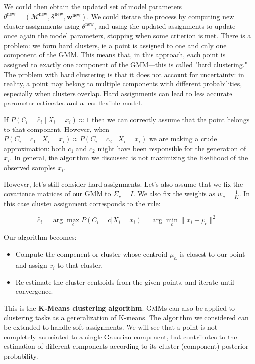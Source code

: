 We could then obtain the updated set of model parameters $\theta^{\text{new}} = (\mathcal{M}^{\text{new}}, \mathcal{S}^{\text{new}}, \mathbf{w}^{\text{new}})$. We could iterate the process by computing new cluster assignments using $\theta^{\text{new}}$, and using the updated assignments to update once again the model parameters, stopping when some criterion is met. There is a problem: we form hard clusters, ie a point is assigned to one and only one component of the GMM. This means that, in this approach, each point is assigned to exactly one component of the GMM—this is called "hard clustering." The problem with hard clustering is that it does not account for uncertainty: in reality, a point may belong to multiple components with different probabilities, especially when clusters overlap. Hard assignments can lead to less accurate parameter estimates and a less flexible model.

If $P(C_i = \hat{c}_i \mid X_i = x_i) \approx 1$ then we can correctly assume that the point belongs to that component. However, when $P(C_i = c_1 \mid X_i = x_i) \approx P(C_i = c_2 \mid X_i = x_i)$ we are making a crude approximation: both $c_1$ and $c_2$ might have been responsible for the generation of $x_i$. In general, the algorithm we discussed is not maximizing the likelihood of the observed samples $x_i$.

However, let's still consider hard-assignments. Let's also assume that we fix the covariance matrices of our GMM to $\Sigma_c = I$. We also fix the weights as $w_c = \frac{1}{K}$. In this case cluster assignment corresponds to the rule:


\begin{equation*}
\hat{c}_i = \arg\max_c P(C_i = c | X_i = x_i) = \arg\min_c \|x_i - \mu_c\|^2
\end{equation*}

Our algorithm becomes:

\begin{itemize}
	\item Compute the component or cluster whose centroid $\mu_{\hat{c}_i}$ is closest to our point and assign $x_i$ to that cluster.
	\item Re-estimate the cluster centroids from the given points, and iterate until convergence.
\end{itemize}

This is the \textbf{K-Means clustering algorithm}. GMMs can also be applied to clustering tasks as a generalization of K-means. The algorithm we considered can be extended to handle soft assignments. We will see that a point is not completely associated to a single Gaussian component, but contributes to the estimation of different components according to its cluster (component) posterior probability.

